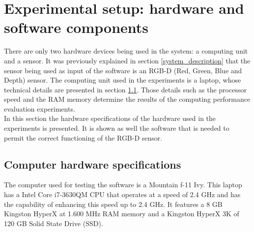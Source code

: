 \section{Experimental setup: hardware and software components}
There are only two hardware devices being used in the system: a computing unit and a sensor. 
It was previously explained in section \ref{system_description} that the sensor being used as input of the software is an RGB-D (Red, Green, Blue and Depth) sensor. 
The computing unit used in the experiments is a laptop, whose technical details are presented in section \ref{computer}. 
Those details such as the processor speed and the RAM memory determine the results of the computing performance evaluation experiments. 
\\

In this section the hardware specifications of the hardware used in the experiments is presented. 
It is shown as well the software that is needed to permit the correct functioning of the RGB-D sensor.



\subsection{Computer hardware specifications}
\label{computer}
	The computer used for testing the software is a Mountain f-11 Ivy. %
	This laptop has a Intel Core i7-3630QM  CPU that operates at a speed of 2.4 GHz and has the capability of enhancing this speed up to 2.4 GHz. 
	It features a 8 GB Kingston HyperX at 1.600 MHz RAM memory and a  Kingston HyperX 3K of 120 GB Solid State Drive (SSD).




